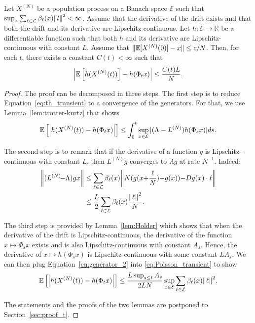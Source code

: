 \documentclass[acmlarge]{acmart}
\newcommand\XN{X^{(N)}}
\newcommand\LN{L^{(N)}}
\newcommand\E{\mathcal{E}}
\newcommand\R{\mathbb{R}}
\newcommand\calL{\mathcal{L}}
\newcommand\esp[1]{{\mathchoice{\besp{#1}}{\sesp{#1}}{\sesp{#1}}{\sesp{#1}}}}
\newcommand\besp[1]{\mathbb{E}\left[#1\right]}
\newcommand\sesp[1]{\mathbb{E}[#1]}
\newcommand\norm[1]{{\mathchoice{\bnorm{#1}}{\snorm{#1}}{\snorm{#1}}{\snorm{#1}}}}
\newcommand\bnorm[1]{\left\|#1\right\|}
\newcommand\snorm[1]{\|#1\|}
\newcommand\abs[1]{\left|#1\right|}
\begin{document}
\begin{theorem}
  \label{th:transient}
  Let $\XN$ be a population process on a Banach space $\E$ such that
  $\sup_x\sum_{\ell\in\calL}\beta_\ell(x)\norm{l}^2<\infty$. Assume
  that the derivative of the drift exists and that both the drift and
  its derivative are Lipschitz-continuous.  Let $h:\E\to\R$ be a
  differentiable function such that both $h$ and its derivative are
  Lipschitz-continuous with constant $L$. Assume that
  $\snorm{\esp{\XN(0)}-x}\le c/N$. Then, for each $t$, there
  exists a constant $C(t)<\infty$ such that
  \begin{align}
    \label{eq:th_transient}
    \abs{\esp{h(\XN(t))} - h(\Phi_tx)} \le \frac{C(t)L}{N}.
  \end{align}
\end{theorem}

\begin{proof}
  The proof can be decomposed in three steps.  The first step is to
  reduce Equation~\eqref{eq:th_transient} to a convergence of the
  generators. For that, we use Lemma~\ref{lem:trotter-kurtz} that
  shows
  \begin{align}
    \esp{\abs{h(\XN(t))-h(\Phi_tx)}} \le
    \int_0^t\sup_{x\in\E}|(\Lambda-\LN)h(\Phi_sx)|ds.
    \label{eq:Poisson_transient}
  \end{align}
  
  The second step is to remark that if the derivative of a function
  $g$ is Lipschitz-continuous with constant $L$, then $\LN g$
  converges to $\Lambda g$ at rate $N^{-1}$. Indeed:
  \begin{align}
    \bigg\|(\LN\!{-}\Lambda)g x\bigg\|
    &\le \sum_{\ell\in\calL}
      \beta_\ell(x)\bigg\|N(g(x{+}\frac{\ell}{N}){-}g(x)){-}Dg(x)
      \cdot \ell \bigg\|\nonumber\\
    &\le \frac{L}{2}\sum_{\ell\in\calL} \beta_\ell(x)
      \frac{\norm{\ell}^{2}}{{N}}. 
      \label{eq:generator_2}
  \end{align}
  
  The third step is provided by Lemma~\ref{lem:Holder} which shows
  that when the derivative of the drift is Lipschitz-continuous, the
  derivative of the function $x\mapsto \Phi_s x$ exists and is also
  Lipschitz-continuous with constant $A_s$. Hence, the derivative of
  $x\mapsto h(\Phi_sx)$ is Lipschitz-continuous with some constant
  $LA_s$. We can then plug Equation~\eqref{eq:generator_2} into
  \eqref{eq:Poisson_transient} to show
  \begin{align*}
    \esp{\abs{h(\XN(t))-h(\Phi_tx)}} \le \frac{L\sup_{s\le
    t}A_s}{2LN}\sup_{x\in\E}\sum_{\ell\in\calL}\beta_\ell(x)\norm{\ell}^2.  
  \end{align*}
  
  The statements and the proofs of the two lemmas are postponed to
  Section~\ref{sec:proof_t}.
\end{proof}
\end{document}
